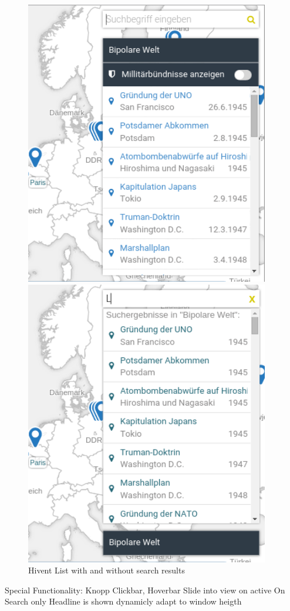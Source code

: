 \begin{figure}[H]
  \centering
  \begin{minipage}{0.45\textwidth}
    \includegraphics[width=0.95\textwidth]{graphics/hlsearch1.png}
  \end{minipage}
  \begin{minipage}{0.45\textwidth}
    \includegraphics[width=0.95\textwidth]{graphics/hlsearch2.png}
  \end{minipage}
  \caption{Hivent List with and without search results}
\end{figure}




Special Functionality: Knopp
Clickbar, Hoverbar
Slide into view on active
On Search only Headline is shown
dynamicly adapt to window heigth

